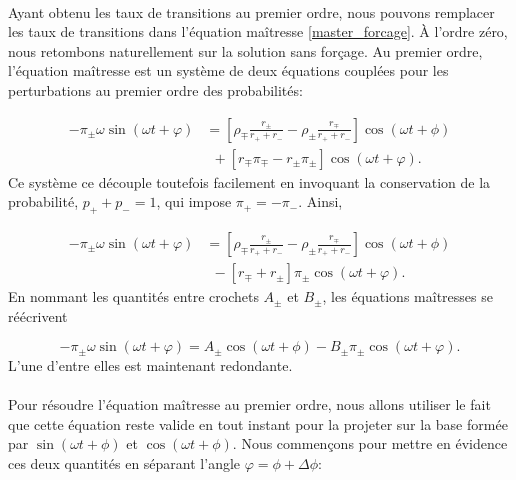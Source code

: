 \paragraph{} Ayant obtenu les taux de transitions au premier ordre, nous pouvons remplacer les taux de transitions dans l'équation maîtresse \ref{master_forcage}. À l'ordre zéro, nous retombons naturellement sur la solution sans forçage. Au premier ordre, l'équation maîtresse est un système de deux équations couplées pour les perturbations au premier ordre des probabilités:

\begin{equation}\label{master_premier_ordre_couple}
\begin{split}
	-\pi_\pm \omega \sin(\omega t + \varphi) &= 
	\left[\rho_\mp \frac{r_\pm}{r_+ + r_-} - \rho_\pm \frac{r_\mp}{r_+ + r_-} \right] \cos(\omega t + \phi) \\
	&\ \ + [r_\mp \pi_\mp - r_\pm \pi_\pm] \cos(\omega t + \varphi).
\end{split}
\end{equation}
Ce système ce découple toutefois facilement en invoquant la conservation de la probabilité, $p_+ + p_- = 1$, qui impose $\pi_+ = -\pi_-$. Ainsi,

\begin{equation}\label{master_premier_ordre_decouple}
\begin{split}
	-\pi_\pm \omega \sin(\omega t + \varphi) &= 
	\left[\rho_\mp \frac{r_\pm}{r_+ + r_-} - \rho_\pm \frac{r_\mp}{r_+ + r_-} \right] \cos(\omega t + \phi) \\
	&\ \ - [r_\mp + r_\pm] \pi_\pm \cos(\omega t + \varphi).
\end{split}
\end{equation}
En nommant les quantités entre crochets $A_\pm$ et $B_\pm$, les équations maîtresses se réécrivent

\begin{equation}\label{master_premier_ordre_AB}
	-\pi_\pm \omega \sin(\omega t + \varphi) = 
	A_\pm \cos(\omega t + \phi) - B_\pm \pi_\pm \cos(\omega t + \varphi).
\end{equation}
L'une d'entre elles est maintenant redondante.

\paragraph{} Pour résoudre l'équation maîtresse au premier ordre, nous allons utiliser le fait que cette équation reste valide en tout instant pour la projeter sur la base formée par $\sin(\omega t+\phi)$ et $\cos(\omega t+\phi)$. Nous commençons pour mettre en évidence ces deux quantités en séparant l'angle $\varphi = \phi + \Delta \phi$:

